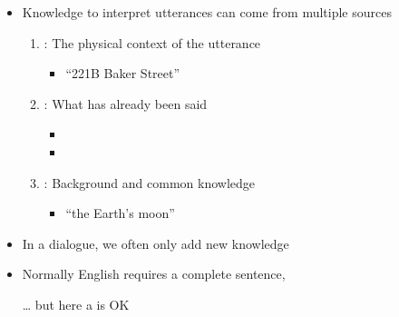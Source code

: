 \documentclass[a4paper,landscape,headrule,footrule,xetex]{foils}
\begin{document}
\begin{itemize}\addtolength{\itemsep}{1.5ex}
\item Knowledge to interpret utterances can come from multiple sources
  \begin{enumerate}\addtolength{\itemsep}{1ex}
  \item {}: The physical context of the utterance
    \begin{itemize}
    \item {} ``221B Baker Street'' 
    \end{itemize}

  \item {}: What has already been said
    \begin{itemize}
    \item {}
    \item {} 
    \end{itemize}
  \item {}: Background and common knowledge
   \begin{itemize}
    \item {} ``the Earth's moon''
    \end{itemize}

  \end{enumerate}
\end{itemize}

\begin{itemize}
\item In a dialogue, we often only add new knowledge
  \begin{exe}
    \ex 
    \begin{xlist}
      \ex {}
      \ex {}
  \end{xlist}
    \ex 
    \begin{xlist}
      \ex {}
      \ex {}
  \end{xlist}
  \ex
  \begin{xlist}
   \ex {}
   \ex {} \hfill {}
 \end{xlist}
\end{exe}
\item Normally English requires a complete sentence, 
\item[\ldots] but here a  is OK
\end{itemize}
\end{document}
